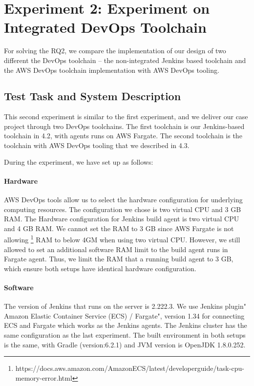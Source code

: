 \section{Experiment 2: Experiment on Integrated DevOps Toolchain}
For solving the RQ2, we compare the implementation of our design of two different the DevOps toolchain -- the non-integrated Jenkins based toolchain and the AWS DevOps toolchain implementation with AWS DevOps tooling.
\subsection{Test Task and System Description}
This second experiment is similar to the first experiment, and we deliver our case project through two DevOps toolchains. The first toolchain is our Jenkins-based toolchain in 4.2, with agents runs on AWS Fargate. The second toolchain is the toolchain with AWS DevOps tooling that we described in 4.3.
\par
During the experiment, we have set up as follows:
\paragraph{Hardware}
AWS DevOps tools allow us to select the hardware configuration for underlying computing resources. The configuration we chose is two virtual CPU and 3 GB RAM.
The Hardware configuration for Jenkins build agent is two virtual CPU and 4 GB RAM. We cannot set the RAM to 3 GB since AWS Fargate is not allowing \footnote{https://docs.aws.amazon.com/AmazonECS/latest/developerguide/task-cpu-memory-error.html} RAM to below 4GM when using two virtual CPU. However, we still allowed to set an additional software RAM limit to the build agent runs in Fargate agent. Thus, we limit the RAM that a running build agent to 3 GB, which ensure both setups have identical hardware configuration.
\paragraph{Software}
The version of Jenkins that runs on the server is 2.222.3. We use Jenkins plugin" Amazon Elastic Container Service (ECS) / Fargate", version 1.34 for connecting ECS and Fargate which works as the Jenkins agents. The Jenkins cluster has the same configuration as the last experiment. The built environment in both setups is the same, with Gradle (version:6.2.1) and JVM version is OpenJDK 1.8.0.252.
